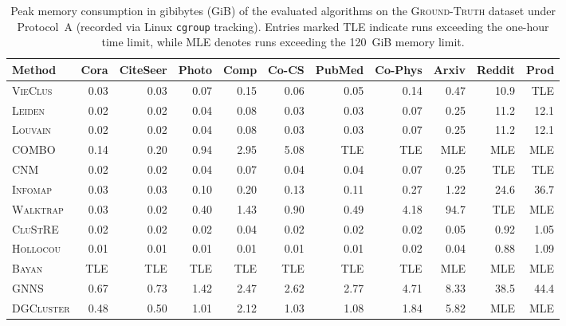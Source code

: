 \documentclass[11pt,a4paper]{article}
\begin{document}
\begin{table}[H]
    \centering
    \caption{Peak memory consumption in gibibytes (GiB) of the evaluated algorithms on the \textsc{Ground-Truth} dataset under Protocol~A (recorded via Linux \texttt{cgroup} tracking). Entries marked \textsc{TLE} indicate runs exceeding the one-hour time limit, while \textsc{MLE} denotes runs exceeding the 120~GiB memory limit.}
    \label{tab:memory}
    \vspace{0.5em}
    \small
    \setlength{\tabcolsep}{3.5pt}
    \begin{tabular*}{\textwidth}{@{\extracolsep{\fill}}l rrrrrrrrrr@{}}
        \toprule
        Method             & Cora & CiteSeer & Photo & Comp & Co-CS & PubMed & Co-Phys & Arxiv & Reddit & Prod \\
        \midrule
        \textsc{VieClus}   & 0.03 & 0.03     & 0.07  & 0.15 & 0.06  & 0.05   & 0.14    & 0.47  & 10.9   & TLE  \\
        \textsc{Leiden}    & 0.02 & 0.02     & 0.04  & 0.08 & 0.03  & 0.03   & 0.07    & 0.25  & 11.2   & 12.1 \\
        \textsc{Louvain}   & 0.02 & 0.02     & 0.04  & 0.08 & 0.03  & 0.03   & 0.07    & 0.25  & 11.2   & 12.1 \\
        \textsc{COMBO}     & 0.14 & 0.20     & 0.94  & 2.95 & 5.08  & TLE    & TLE     & MLE   & MLE    & MLE  \\
        \textsc{CNM}       & 0.02 & 0.02     & 0.04  & 0.07 & 0.04  & 0.04   & 0.07    & 0.25  & TLE    & TLE  \\
        \textsc{Infomap}   & 0.03 & 0.03     & 0.10  & 0.20 & 0.13  & 0.11   & 0.27    & 1.22  & 24.6   & 36.7 \\
        \textsc{Walktrap}  & 0.03 & 0.02     & 0.40  & 1.43 & 0.90  & 0.49   & 4.18    & 94.7  & TLE    & MLE  \\
        \textsc{CluStRE}   & 0.02 & 0.02     & 0.02  & 0.04 & 0.02  & 0.02   & 0.02    & 0.05  & 0.92   & 1.05 \\
        \textsc{Hollocou}  & 0.01 & 0.01     & 0.01  & 0.01 & 0.01  & 0.01   & 0.02    & 0.04  & 0.88   & 1.09 \\
        \textsc{Bayan}     & TLE  & TLE      & TLE   & TLE  & TLE   & TLE    & TLE     & MLE   & MLE    & MLE  \\
        \midrule
        \textsc{GNNS}      & 0.67 & 0.73     & 1.42  & 2.47 & 2.62  & 2.77   & 4.71    & 8.33  & 38.5   & 44.4 \\
        \textsc{DGCluster} & 0.48 & 0.50     & 1.01  & 2.12 & 1.03  & 1.08   & 1.84    & 5.82  & MLE    & MLE  \\

\end{tabular*}
\end{table}
\end{document}
